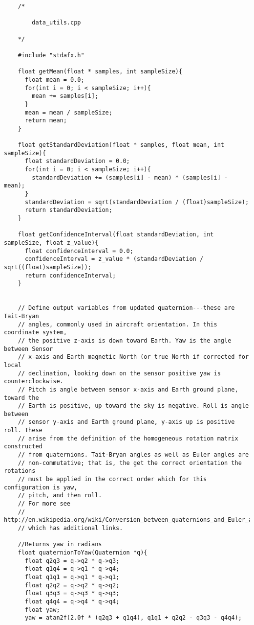 	\begin{lstlisting}
	/*

		data_utils.cpp

	*/

	#include "stdafx.h"

	float getMean(float * samples, int sampleSize){
	  float mean = 0.0;
	  for(int i = 0; i < sampleSize; i++){
	    mean += samples[i];
	  }
	  mean = mean / sampleSize;
	  return mean;
	}

	float getStandardDeviation(float * samples, float mean, int sampleSize){
	  float standardDeviation = 0.0;
	  for(int i = 0; i < sampleSize; i++){
	    standardDeviation += (samples[i] - mean) * (samples[i] - mean);
	  }
	  standardDeviation = sqrt(standardDeviation / (float)sampleSize);
	  return standardDeviation;
	}

	float getConfidenceInterval(float standardDeviation, int sampleSize, float z_value){
	  float confidenceInterval = 0.0;
	  confidenceInterval = z_value * (standardDeviation / sqrt((float)sampleSize));
	  return confidenceInterval;
	}


	// Define output variables from updated quaternion---these are Tait-Bryan
	// angles, commonly used in aircraft orientation. In this coordinate system,
	// the positive z-axis is down toward Earth. Yaw is the angle between Sensor
	// x-axis and Earth magnetic North (or true North if corrected for local
	// declination, looking down on the sensor positive yaw is counterclockwise.
	// Pitch is angle between sensor x-axis and Earth ground plane, toward the
	// Earth is positive, up toward the sky is negative. Roll is angle between
	// sensor y-axis and Earth ground plane, y-axis up is positive roll. These
	// arise from the definition of the homogeneous rotation matrix constructed
	// from quaternions. Tait-Bryan angles as well as Euler angles are
	// non-commutative; that is, the get the correct orientation the rotations
	// must be applied in the correct order which for this configuration is yaw,
	// pitch, and then roll.
	// For more see
	// http://en.wikipedia.org/wiki/Conversion_between_quaternions_and_Euler_angles
	// which has additional links.

	//Returns yaw in radians
	float quaternionToYaw(Quaternion *q){
	  float q2q3 = q->q2 * q->q3;
	  float q1q4 = q->q1 * q->q4;
	  float q1q1 = q->q1 * q->q1;
	  float q2q2 = q->q2 * q->q2;
	  float q3q3 = q->q3 * q->q3;
	  float q4q4 = q->q4 * q->q4;
	  float yaw;
	  yaw = atan2f(2.0f * (q2q3 + q1q4), q1q1 + q2q2 - q3q3 - q4q4);


\end{lstlisting}
